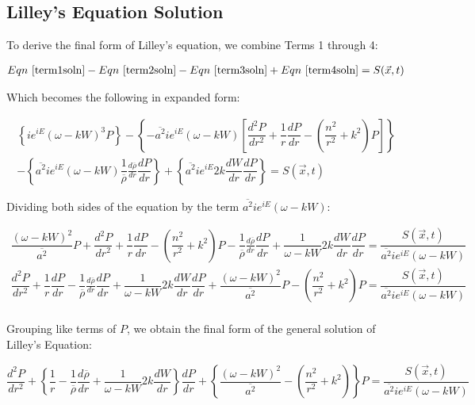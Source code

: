 \documentclass[]{aiaa-tc}%
\begin{document}
\subsection{Lilley's Equation Solution}

To derive the final form of Lilley's equation, we combine Terms 1 through 4:

\begin{align*}
Eqn~\ref{term1soln} - Eqn~\ref{term2soln} - Eqn~\ref{term3soln} + Eqn~\ref{term4soln} = S(\vec{x}, t)
\end{align*}

Which becomes the following in expanded form:

\begin{align*}
\left\{ ie^{iE} (\omega - kW)^3 P \right\}
- \left\{ - \overline{a^2} ie^{iE}
    (\omega - kW) \left[ \dfrac{d^2P}{dr^2}
    + \dfrac{1}{r} \dfrac{dP}{dr}
    - \left( \dfrac{n^2}{r^2} + k^2 \right) P \right] \right\} \\
- \left\{ \overline{a^2} ie^{iE} (\omega - kW)
    \dfrac{1}{\overline{\rho}}\frac{d \overline{\rho}}{dr} \dfrac{dP}{dr} \right\}
+ \left\{ \overline{a^2} ie^{iE} 2k \dfrac{dW}{dr} \dfrac{dP}{dr} \right\}
= S(\vec{x}, t)
\end{align*}

Dividing both sides of the equation by the term $\overline{a^2} ie^{iE} (\omega - kW)$:

\begin{align*}
\dfrac{(\omega - kW)^2}{\overline{a^2}} P
+ \dfrac{d^2P}{dr^2}
+ \dfrac{1}{r} \dfrac{dP}{dr}
- \left( \dfrac{n^2}{r^2} + k^2 \right) P
- \dfrac{1}{\overline{\rho}}\frac{d \overline{\rho}}{dr} \dfrac{dP}{dr}
+ \dfrac{1}{\omega - kW} 2k \dfrac{dW}{dr} \dfrac{dP}{dr}
= \dfrac{S(\vec{x}, t)}{\overline{a^2} ie^{iE} (\omega - kW)} \\
\dfrac{d^2P}{dr^2}
+ \dfrac{1}{r} \dfrac{dP}{dr}
- \dfrac{1}{\overline{\rho}}\frac{d \overline{\rho}}{dr} \dfrac{dP}{dr}
+ \dfrac{1}{\omega - kW} 2k \dfrac{dW}{dr} \dfrac{dP}{dr}
+ \dfrac{(\omega - kW)^2}{\overline{a^2}} P
- \left( \dfrac{n^2}{r^2} + k^2 \right) P
= \dfrac{S(\vec{x}, t)}{\overline{a^2} ie^{iE} (\omega - kW)} \\
\end{align*}

Grouping like terms of $P$, we obtain the final form of the general solution of Lilley's Equation:

\begin{equation} \label{lilleysoln}
\boxed{
\dfrac{d^2P}{dr^2}
+ \left\{
    \dfrac{1}{r}
    - \dfrac{1}{\overline{\rho}}\frac{d \overline{\rho}}{dr}
    + \dfrac{1}{\omega - kW} 2k \dfrac{dW}{dr}
\right\} \dfrac{dP}{dr}
+ \left\{
    \dfrac{(\omega - kW)^2}{\overline{a^2}}
    - \left( \dfrac{n^2}{r^2} + k^2 \right)
\right\} P
= \dfrac{S(\vec{x}, t)}{\overline{a^2} ie^{iE} (\omega - kW)} }
\end{equation}
\end{document}
